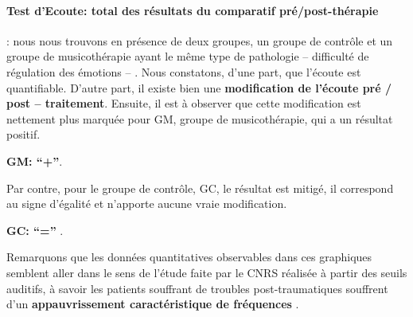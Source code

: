 

\paragraph{Test d'Ecoute: total des résultats du comparatif pré/post-thérapie}
 : nous nous trouvons
           en présence de deux groupes, un groupe de contrôle et un
           groupe de musicothérapie ayant le même type de
           pathologie -- difficulté de régulation des émotions -- .
Nous constatons, d'une part, que l'écoute est quantifiable.
           D'autre part, il existe bien
          une \textbf{modification de l'écoute pré / post -- traitement}.
Ensuite, il est à observer que
          cette modification est nettement plus marquée
          pour GM, groupe de musicothérapie, qui a un résultat positif.


          \textbf{GM: ``+''}.


Par contre,  pour le groupe de contrôle, GC, le résultat est mitigé, il correspond au signe d'égalité et n'apporte aucune vraie modification.

          \textbf{GC:  ``='' }.


Remarquons que les données quantitatives observables dans
ces graphiques sem\-blent aller dans le
sens de  l'étude faite par le
CNRS  réalisée à partir des seuils auditifs, à savoir
les patients souffrant de troubles post-traumatiques souffrent d'un
\textbf{appauvrissement caractéristique de fréquences} \autocite{affectiveDisorders}.

